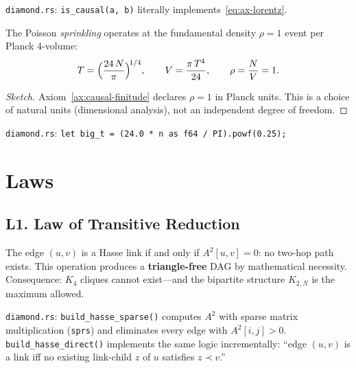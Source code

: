 \medskip\noindent
\texttt{diamond.rs}: \texttt{is\_causal(a, b)} literally
implements~\eqref{eq:ax-lorentz}.

\begin{theorem}
\label{thm:planck-density}
The Poisson \emph{sprinkling} operates at the fundamental
density $\rho = 1$ event per Planck 4-volume:
\begin{equation}
  T = \Bigl(\frac{24\,N}{\pi}\Bigr)^{\!1/4},
  \qquad
  V = \frac{\pi\,T^4}{24},
  \qquad
  \rho = \frac{N}{V} = 1.
  \label{eq:ax-planck}
\end{equation}
\end{theorem}

\begin{proof}[Sketch]
Axiom~\ref{ax:causal-finitude} declares $\rho = 1$ in Planck
units. This is a choice of natural units (dimensional
analysis), not an independent degree of freedom.
\end{proof}

\medskip\noindent
\texttt{diamond.rs}: \texttt{let big\_t =
(24.0 * n as f64 / PI).powf(0.25);}

\section{Laws}

\subsection*{L1. Law of Transitive Reduction}
\label{law:transitive-reduction}

The edge $(u,v)$ is a Hasse link if and only if
$A^2[u,v] = 0$: no two-hop path exists. This
operation produces a \textbf{triangle-free} DAG by
mathematical necessity. Consequence: $K_4$ cliques cannot
exist---and the bipartite structure $K_{2,N}$ is the
maximum allowed.

\medskip\noindent
\texttt{diamond.rs}: \texttt{build\_hasse\_sparse()} computes
$A^2$ with sparse matrix multiplication (\texttt{sprs}) and
eliminates every edge with $A^2[i,j] > 0$.
\texttt{build\_hasse\_direct()} implements the same logic
incrementally: ``edge $(u,v)$ is a link iff no existing
link-child $z$ of $u$ satisfies $z \prec v$.''


